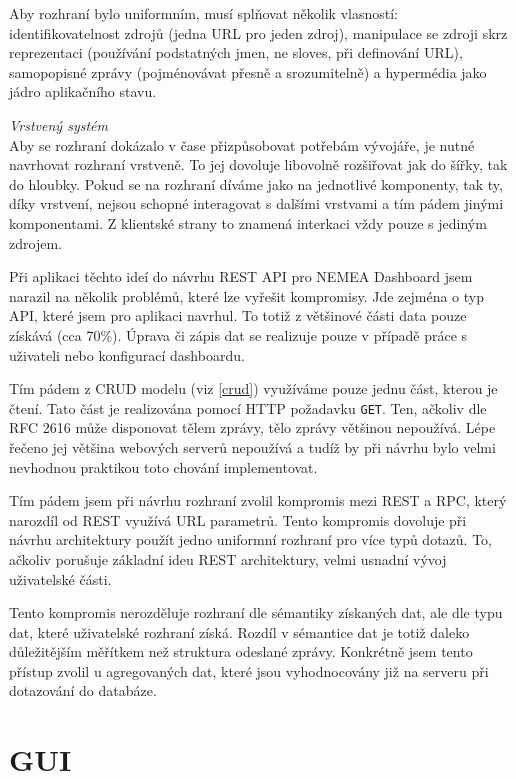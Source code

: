 \begin{description}
        Aby rozhraní bylo uniformním, musí splňovat několik vlasností: identifikovatelnost zdrojů (jedna URL pro jeden zdroj), manipulace se zdroji skrz reprezentaci (používání podstatných jmen, ne sloves, při definování URL), samopopisné zprávy (pojménovávat přesně a srozumitelně) a hypermédia jako jádro aplikačního stavu.

    \item \textit{Vrstvený systém} \\
        Aby se rozhraní dokázalo v čase přizpůsobovat potřebám vývojáře, je nutné navrhovat rozhraní vrstveně. To jej dovoluje libovolně rozšiřovat jak do šířky, tak do hloubky. Pokud se na rozhraní díváme jako na jednotlivé komponenty, tak ty, díky vrstvení, nejsou schopné interagovat s dalšími vrstvami a tím pádem jinými komponentami. Z klientské strany to znamená interkaci vždy pouze s jediným zdrojem.
        
\end{description}

Při aplikaci těchto ideí do návrhu REST API pro NEMEA Dashboard jsem narazil na několik problémů, které lze vyřešit kompromisy. Jde zejména o typ API, které jsem pro aplikaci navrhul. To totiž z většinové části data pouze získává (cca 70\%). Úprava či zápis dat se realizuje pouze v případě práce s uživateli nebo konfigurací dashboardu.

Tím pádem z CRUD modelu (viz \ref{crud}) využíváme pouze jednu část, kterou je čtení. Tato část je realizována pomocí HTTP požadavku \texttt{GET}. Ten, ačkoliv dle RFC 2616 \cite{rfc:http} může disponovat tělem zprávy, tělo zprávy většinou nepoužívá. Lépe řečeno jej většina webových serverů nepoužívá a tudíž by při návrhu bylo velmi nevhodnou praktikou toto chování implementovat. 

Tím pádem jsem při návrhu rozhraní zvolil kompromis mezi REST a RPC, který narozdíl od REST využívá URL parametrů. Tento kompromis dovoluje při návrhu architektury použít jedno uniformní rozhraní pro více typů dotazů. To, ačkoliv porušuje základní ideu REST architektury, velmi usnadní vývoj uživatelské části.

Tento kompromis nerozděluje rozhraní dle sémantiky získaných dat, ale dle typu dat, které uživatelské rozhraní získá. Rozdíl v sémantice dat je totiž daleko důležitějším měřítkem než struktura odeslané zprávy. Konkrétně jsem tento přístup zvolil u agregovaných dat, které jsou vyhodnocovány již na serveru při dotazování do databáze.

\section{GUI}

